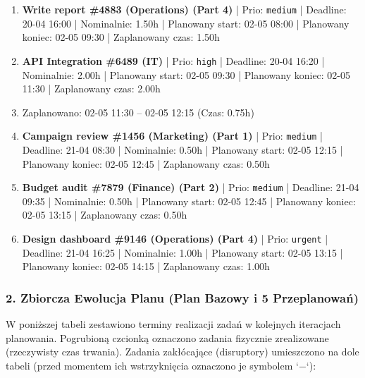 {\begin{enumerate}
  \item [\textbf{14651}] \textbf{Write report \#4883 (Operations) (Part 4)} | Prio: \texttt{medium} | Deadline: 20-04 16:00 | Nominalnie: 1.50h | Planowany start: 02-05 08:00 | Planowany koniec: 02-05 09:30 | Zaplanowany czas: 1.50h
  \item [\textbf{14620}] \textbf{API Integration \#6489 (IT)} | Prio: \texttt{high} | Deadline: 20-04 16:20 | Nominalnie: 2.00h | Planowany start: 02-05 09:30 | Planowany koniec: 02-05 11:30 | Zaplanowany czas: 2.00h
  \item [\textbf{PRZERWA}] Zaplanowano: 02-05 11:30 -- 02-05 12:15 (Czas: 0.75h)
  \item [\textbf{14653}] \textbf{Campaign review \#1456 (Marketing) (Part 1)} | Prio: \texttt{medium} | Deadline: 21-04 08:30 | Nominalnie: 0.50h | Planowany start: 02-05 12:15 | Planowany koniec: 02-05 12:45 | Zaplanowany czas: 0.50h
  \item [\textbf{14644}] \textbf{Budget audit \#7879 (Finance) (Part 2)} | Prio: \texttt{medium} | Deadline: 21-04 09:35 | Nominalnie: 0.50h | Planowany start: 02-05 12:45 | Planowany koniec: 02-05 13:15 | Zaplanowany czas: 0.50h
  \item [\textbf{14606}] \textbf{Design dashboard \#9146 (Operations) (Part 4)} | Prio: \texttt{urgent} | Deadline: 21-04 16:25 | Nominalnie: 1.00h | Planowany start: 02-05 13:15 | Planowany koniec: 02-05 14:15 | Zaplanowany czas: 1.00h
\end{enumerate}
}

\subsubsection*{2. Zbiorcza Ewolucja Planu (Plan Bazowy i 5 Przeplanowań)}

W poniższej tabeli zestawiono terminy realizacji zadań w kolejnych iteracjach planowania. Pogrubioną czcionką oznaczono zadania fizycznie zrealizowane (rzeczywisty czas trwania). Zadania zakłócające (disruptory) umieszczono na dole tabeli (przed momentem ich wstrzyknięcia oznaczono je symbolem `$-$`):

